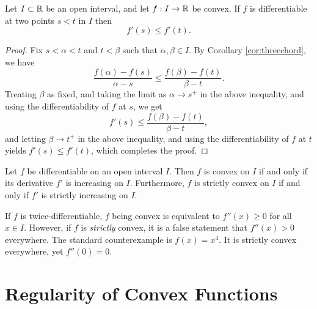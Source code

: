 \documentclass[../analysis1.tex]{subfiles}
\begin{document}
\begin{theorem}
    \begin{shaded*}
        Let $I\subset\mathbb{R}$ be an open interval, and let $f:I\to\mathbb{R}$ be convex. If $f$ is differentiable at two points $s<t$ in $I$ then \[f'(s)\le f'(t).\]
    \end{shaded*}
\end{theorem}
\begin{proof}
    Fix $s<\alpha<t$ and $t<\beta$ such that $\alpha,\beta\in I$. By Corollary \ref{cor:threechord}, we have
    \[\frac{f(\alpha)-f(s)}{\alpha -s}\le \frac{f(\beta)-f(t)}{\beta - t}.\]
    Treating $\beta$ as fixed, and taking the limit as $\alpha \to s^+$ in the above inequality, and using the differentiability of $f$ at $s$, we get
    \[f'(s)\le \frac{f(\beta) - f(t)}{\beta - t},\]
    and letting $\beta\to t^+$ in the above inequality, and using the differentiability of $f$ at $t$ yields $f'(s)\le f'(t)$, which completes the proof.\qedhere
\end{proof}

\begin{corollary}
    \begin{shaded*}
        Let $f$ be differentiable on an open interval $I$. Then $f$ is convex on $I$ if and only if its derivative $f'$ is increasing on $I$. Furthermore, $f$ is strictly convex on $I$ if and only if $f'$ is strictly increasing on $I$.
    \end{shaded*}
\end{corollary}

\begin{remark}
    If $f$ is twice-differentiable, $f$ being convex is equivalent to $f''(x) \ge 0$ for all $x \in I$. 
    However, if $f$ is \textit{strictly} convex, it is a false statement that $f''(x) > 0$ everywhere. The standard counterexample is $f(x) = x^4$. It is strictly convex everywhere, yet $f''(0) = 0$. 
\end{remark}

\section{Regularity of Convex Functions}
\end{document}
